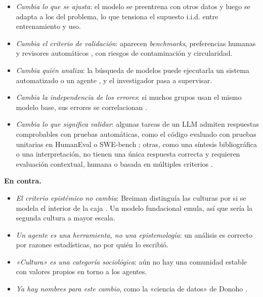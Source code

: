 \documentclass[11pt,a4paper]{article}
\providecommand{\tightlist}{\setlength{\itemsep}{0pt}\setlength{\parskip}{0pt}}
\begin{document}
\begin{itemize}
\tightlist
\item
  \emph{Cambia lo que se ajusta}: el modelo se preentrena con otros datos y luego se adapta a los del problema, lo que tensiona el supuesto i.i.d. entre entrenamiento y uso.
\item
  \emph{Cambia el criterio de validación}: aparecen \emph{benchmarks}, preferencias humanas y revisores automáticos \autocite{lu2024}, con riesgos de contaminación y circularidad.
\item
  \emph{Cambia quién analiza}: la búsqueda de modelos puede ejecutarla un sistema automatizado o un agente \autocite{hutter2019,yang2024}, y el investigador pasa a supervisar.
\item
  \emph{Cambia la independencia de los errores}: si muchos grupos usan el mismo modelo base, sus errores se correlacionan \autocite{bommasani2021,messeri2024}.
\item
  \emph{Cambia lo que significa validar}: algunas tareas de un LLM admiten respuestas comprobables con pruebas automáticas, como el código evaluado con pruebas unitarias en HumanEval o SWE-bench \autocite{chen2021,jimenez2024}; otras, como una síntesis bibliográfica o una interpretación, no tienen una única respuesta correcta y requieren evaluación contextual, humana o basada en múltiples criterios \autocite{ji2023}.
\end{itemize}

\textbf{En contra.}

\begin{itemize}
\tightlist
\item
  \emph{El criterio epistémico no cambia}: Breiman distinguía las culturas por si se modela el interior de la caja \autocite[231]{breiman2001}. Un modelo fundacional emula, así que sería la segunda cultura a mayor escala.
\item
  \emph{Un agente es una herramienta, no una epistemología}: un análisis es correcto por razones estadísticas, no por quién lo escribió.
\item
  \emph{«Cultura» es una categoría sociológica}: aún no hay una comunidad estable con valores propios en torno a los agentes.
\item
  \emph{Ya hay nombres para este cambio}, como la «ciencia de datos» de Donoho \autocite{donoho2017}.
\end{itemize}
\end{document}
